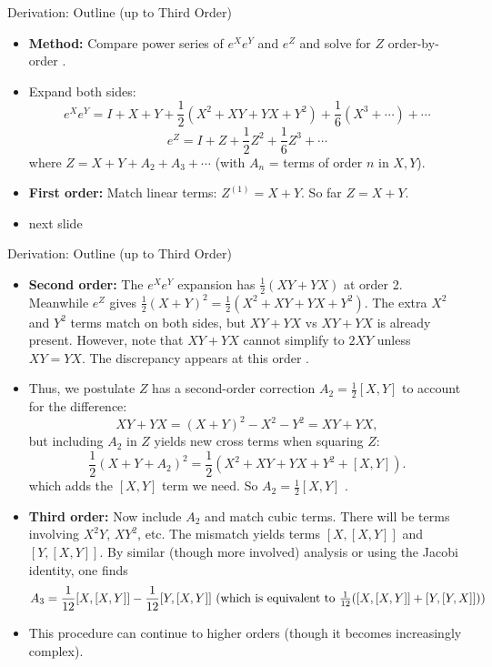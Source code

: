 \documentclass{beamer}
\begin{document}
\begin{frame}{Derivation: Outline (up to Third Order)}
\begin{itemize}
\item \textbf{Method:} Compare power series of $e^X e^Y$ and $e^Z$ and solve for $Z$ order-by-order .
\item Expand both sides:
\[
e^X e^Y = I + X + Y + \frac{1}{2}(X^2 + XY + YX + Y^2) + \frac{1}{6}(X^3 + \cdots) + \cdots
\]
\[
e^Z = I + Z + \frac{1}{2}Z^2 + \frac{1}{6}Z^3 + \cdots
\]
where $Z = X + Y + A_2 + A_3 + \cdots$ (with $A_n$ = terms of order $n$ in $X,Y$).
\item \textbf{First order:} Match linear terms: $Z^{(1)} = X + Y$. So far $Z = X+Y$.
\item next slide
\end{itemize}
\end{frame}


\begin{frame}{Derivation: Outline (up to Third Order)}
\begin{itemize}
\item \textbf{Second order:} The $e^X e^Y$ expansion has $\frac{1}{2}(XY + YX)$ at order 2. Meanwhile $e^Z$ gives $\frac{1}{2}(X+Y)^2 = \frac{1}{2}(X^2 + XY + YX + Y^2)$. The extra $X^2$ and $Y^2$ terms match on both sides, but $XY+YX$ vs $XY+YX$ is already present. However, note that $XY + YX$ cannot simplify to $2XY$ unless $XY=YX$. The discrepancy appears at this order .
\item Thus, we postulate $Z$ has a second-order correction $A_2 = \frac{1}{2}[X,Y]$ to account for the difference:
\[  
XY + YX = (X+Y)^2 - X^2 - Y^2 = XY + YX,
\]
but including $A_2$ in $Z$ yields new cross terms when squaring $Z$:
\[
\frac{1}{2}(X+Y+A_2)^2 = \frac{1}{2}(X^2 + XY+YX + Y^2 + [X,Y]).
\]
which adds the $[X,Y]$ term we need. So $A_2 = \frac{1}{2}[X,Y]$ .
\item \textbf{Third order:} Now include $A_2$ and match cubic terms. There will be terms involving $X^2Y$, $XY^2$, etc. The mismatch yields terms $[X,[X,Y]]$ and $[Y,[X,Y]]$. By similar (though more involved) analysis or using the Jacobi identity, one finds
\[
A_3 = \frac{1}{12}[X,[X,Y]] - \frac{1}{12}[Y,[X,Y]]$ (which is equivalent to $\frac{1}{12}([X,[X,Y]] + [Y,[Y,X]]))
\]
\item This procedure can continue to higher orders (though it becomes increasingly complex).
\end{itemize}
\end{frame}
\end{document}
